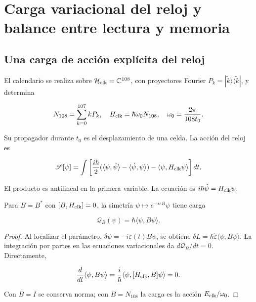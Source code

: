 \section{Carga variacional del reloj y balance entre lectura y memoria}

\subsection{Una carga de acción explícita del reloj}

El calendario se realiza sobre \(\mathcal H_{\rm clk}=\mathbb C^{108}\), con proyectores Fourier \(P_k=|\widetilde k\rangle\langle\widetilde k|\), y determina

\begin{equation}
N_{108}=\sum_{k=0}^{107}kP_k,\quad
H_{\rm clk}=\hbar\omega_0N_{108},\quad
\omega_0=\frac{2\pi}{108t_0}.
\label{x_reciprocidad:nuc07:eq:12}
\end{equation}

Su propagador durante \(t_0\) es el desplazamiento de una celda. La acción del reloj es

\begin{equation}
\mathscr S[\psi]=\int
\left[\frac{i\hbar}{2}
(\langle\psi,\dot\psi\rangle-\langle\dot\psi,\psi\rangle)
-\langle\psi,H_{\rm clk}\psi\rangle\right]dt.
\label{x_reciprocidad:nuc07:eq:13}
\end{equation}

El producto es antilineal en la primera variable. La ecuación es \(i\hbar\dot\psi=H_{\rm clk}\psi\).

\begin{proposition}
Para \(B=B^*\) con \([B,H_{\rm clk}]=0\), la simetría \(\psi\mapsto e^{-i\varepsilon B}\psi\) tiene carga

\begin{equation}
\mathcal Q_B(\psi)=\hbar\langle\psi,B\psi\rangle.
\label{x_reciprocidad:nuc07:eq:14}
\end{equation}
\end{proposition}

\begin{proof}
Al localizar el parámetro, \(\delta\psi=-i\varepsilon(t)B\psi\), se obtiene
\(\delta L=\hbar\dot\varepsilon\langle\psi,B\psi\rangle\).
La integración por partes en las ecuaciones variacionales da \(d\mathcal Q_B/dt=0\). Directamente,

\[
\frac{d}{dt}\langle\psi,B\psi\rangle
=\frac{i}{\hbar}\langle\psi,[H_{\rm clk},B]\psi\rangle=0.
\]

Con \(B=I\) se conserva norma; con \(B=N_{108}\) la carga es la acción \(E_{\rm clk}/\omega_0\).
\end{proof}

